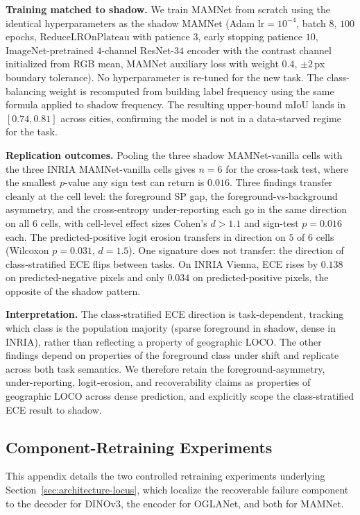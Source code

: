 \textbf{Training matched to shadow.} We train MAMNet from scratch using the identical hyperparameters as the shadow MAMNet (Adam $\text{lr} = 10^{-4}$, batch $8$, $100$ epochs, $\text{ReduceLROnPlateau}$ with patience $3$, early stopping patience $10$, ImageNet-pretrained $4$-channel ResNet-$34$ encoder with the contrast channel initialized from RGB mean, MAMNet auxiliary loss with weight $0.4$, $\pm 2$\,px boundary tolerance). No hyperparameter is re-tuned for the new task. The class-balancing weight is recomputed from building label frequency using the same formula applied to shadow frequency. The resulting upper-bound mIoU lands in $[0.74, 0.81]$ across cities, confirming the model is not in a data-starved regime for the task.

\textbf{Replication outcomes.} Pooling the three shadow MAMNet-vanilla cells with the three INRIA MAMNet-vanilla cells gives $n = 6$ for the cross-task test, where the smallest $p$-value any sign test can return is $0.016$. Three findings transfer cleanly at the cell level: the foreground SP gap, the foreground-vs-background asymmetry, and the cross-entropy under-reporting each go in the same direction on all $6$ cells, with cell-level effect sizes Cohen's $d > 1.1$ and sign-test $p = 0.016$ each. The predicted-positive logit erosion transfers in direction on $5$ of $6$ cells (Wilcoxon $p = 0.031$, $d = 1.5$). One signature does not transfer: the direction of class-stratified ECE flips between tasks. On INRIA Vienna, ECE rises by $0.138$ on predicted-negative pixels and only $0.034$ on predicted-positive pixels, the opposite of the shadow pattern.

\textbf{Interpretation.} The class-stratified ECE direction is task-dependent, tracking which class is the population majority (sparse foreground in shadow, dense in INRIA), rather than reflecting a property of geographic LOCO. The other findings depend on properties of the foreground class under shift and replicate across both task semantics. We therefore retain the foreground-asymmetry, under-reporting, logit-erosion, and recoverability claims as properties of geographic LOCO across dense prediction, and explicitly scope the class-stratified ECE result to shadow.

\subsection{Component-Retraining Experiments}
\label{app:locus-retraining}

This appendix details the two controlled retraining experiments underlying Section~\ref{sec:architecture-locus}, which localize the recoverable failure component to the decoder for DINOv3, the encoder for OGLANet, and both for MAMNet.

